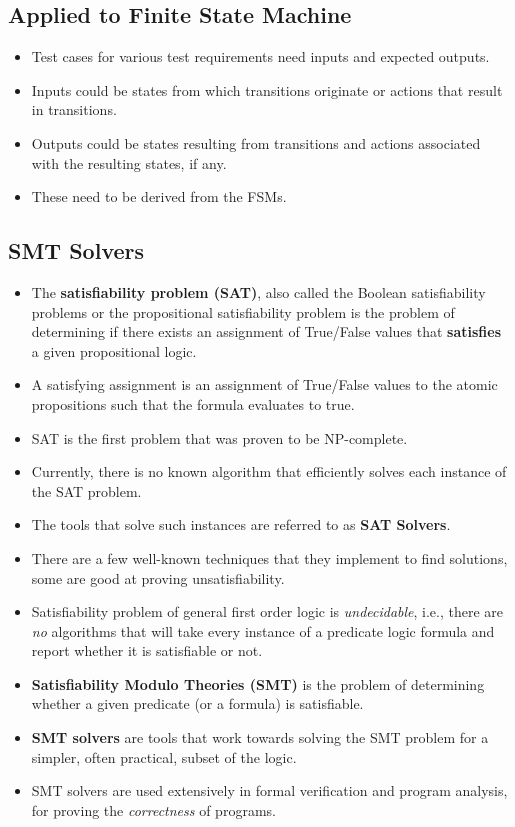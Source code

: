 \documentclass[a4paper]{article}
\begin{document}
\subsection{Applied to Finite State Machine}
\begin{itemize}
    \item Test cases for various test requirements need inputs and expected outputs.
    \item Inputs could be states from which transitions originate or actions that result in transitions.
    \item Outputs could be states resulting from transitions and actions associated with the resulting states, if any.
    \item These need to be derived from the FSMs.
\end{itemize}

\subsection{SMT Solvers}
\begin{itemize}
    \item The \textbf{satisfiability problem (SAT)}, also called the Boolean satisfiability problems or the propositional satisfiability problem is the problem of determining if there exists an assignment of True/False values that \textbf{satisfies} a given propositional logic.
    \item A satisfying assignment is an assignment of True/False values to the atomic propositions such that the formula evaluates to true.
    \item SAT is the first problem that was proven to be NP-complete.
    \item Currently, there is no known algorithm that efficiently solves each instance of the SAT problem.
    \item The tools that solve such instances are referred to as \textbf{SAT Solvers}.
    \item There are a few well-known techniques that they implement to find solutions, some are good at proving unsatisfiability.
    \item Satisfiability problem of general first order logic is \textit{undecidable}, i.e., there are \textit{no} algorithms that will take every instance of a predicate logic formula and report whether it is satisfiable or not.
    \item \textbf{Satisfiability Modulo Theories (SMT)} is the problem of determining whether a given predicate (or a formula) is satisfiable.
    \item \textbf{SMT solvers} are tools that work towards solving the SMT problem for a simpler, often practical, subset of the logic.
    \item SMT solvers are used extensively in formal verification and program analysis, for proving the \textit{correctness} of programs.
\end{itemize}
\end{document}
